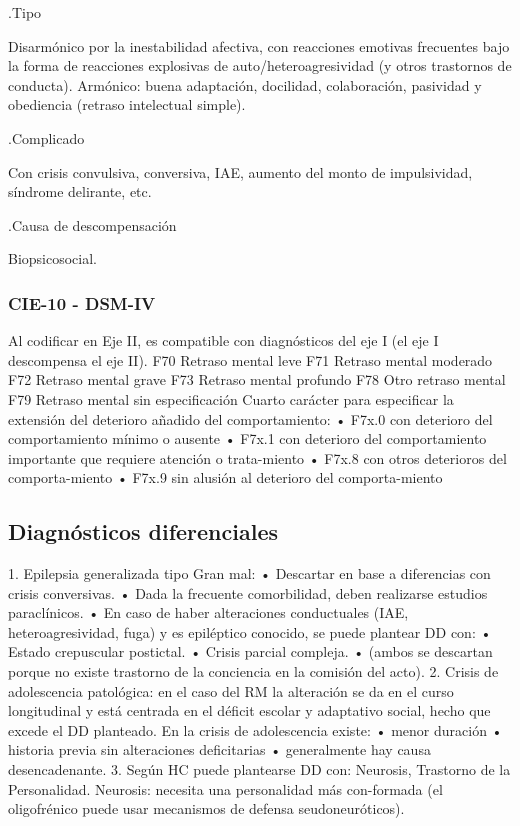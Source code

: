\documentclass{scrbook}
\begin{document}
.Tipo

Disarmónico por la inestabilidad afectiva, con reacciones emotivas frecuentes bajo la forma de reacciones explosivas de auto/heteroagresividad (y otros trastornos de conducta). Armónico: buena adaptación, docilidad, colaboración, pasividad y obediencia (retraso intelectual simple).

.Complicado

Con crisis convulsiva, conversiva, IAE, aumento del monto de impulsividad, síndrome delirante, etc.

.Causa de descompensación

Biopsicosocial.
\subsubsection*{CIE-10 - DSM-IV}
Al codificar en Eje II, es compatible con diagnósticos del eje I (el eje I descompensa el eje II). F70 Retraso mental leve F71 Retraso mental moderado F72 Retraso mental grave F73 Retraso mental profundo F78 Otro retraso mental F79 Retraso mental sin especificación Cuarto carácter para especificar la extensión del deterioro añadido del comportamiento: • F7x.0 con deterioro del comportamiento mínimo o ausente • F7x.1 con deterioro del comportamiento importante que requiere atención o trata-miento • F7x.8 con otros deterioros del comporta-miento • F7x.9 sin alusión al deterioro del comporta-miento
\subsection*{Diagnósticos diferenciales}
1. Epilepsia generalizada tipo Gran mal: • Descartar en base a diferencias con crisis conversivas. • Dada la frecuente comorbilidad, deben realizarse estudios paraclínicos. • En caso de haber alteraciones conductuales (IAE, heteroagresividad, fuga) y es epiléptico conocido, se puede plantear DD con: • Estado crepuscular postictal. • Crisis parcial compleja. • (ambos se descartan porque no existe trastorno de la conciencia en la comisión del acto).
2. Crisis de adolescencia patológica: en el caso del RM la alteración se da en el curso longitudinal y está centrada en el déficit escolar y adaptativo social, hecho que excede el DD planteado. En la crisis de adolescencia existe: • menor duración • historia previa sin alteraciones deficitarias • generalmente hay causa desencadenante.
3. Según HC puede plantearse DD con: Neurosis, Trastorno de la Personalidad. Neurosis: necesita una personalidad más con-formada (el oligofrénico puede usar mecanismos de defensa seudoneuróticos).
\end{document}
